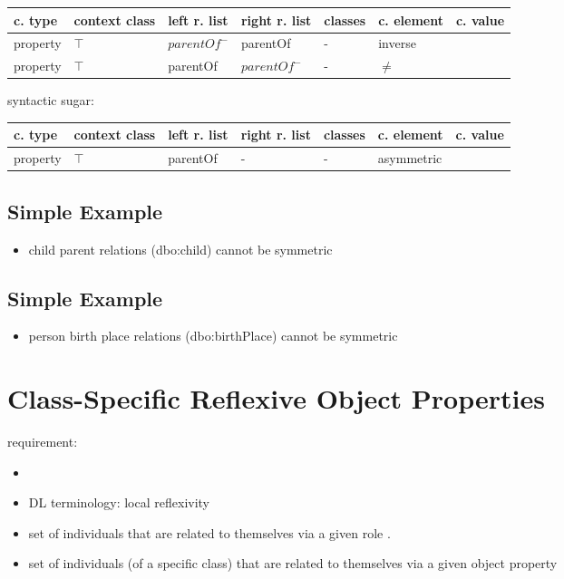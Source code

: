 \documentclass{llncs}
\newenvironment{gcotable}{
  \scriptsize
  \sffamily
  \vspace{0.3cm}
	\begin{center}
  \begin{tabular}{l|l|l|l|l|l|l}
  \hline
  \textbf{c. type} & \textbf{context class} & \textbf{left r. list} & \textbf{right r. list} & \textbf{classes} & \textbf{c. element} & \textbf{c. value} \\
  \hline

}{
  \hline
  \end{tabular}
	\end{center}
}
\begin{document}
\begin{gcotable}
property & $\top$ & $parentOf^{-}$ & parentOf & - & inverse \\
property & $\top$ & parentOf & $parentOf^{-}$ & - & $\ne$ \\
\end{gcotable}

syntactic sugar:

\begin{gcotable}
property & $\top$ & parentOf & - & - & asymmetric \\
\end{gcotable}

\subsection{Simple Example}

\begin{itemize}
	\item child parent relations (dbo:child) cannot be symmetric
\end{itemize}

\subsection{Simple Example}

\begin{itemize}
	\item person birth place relations (dbo:birthPlace) cannot be symmetric
\end{itemize}

\section{Class-Specific Reflexive Object Properties}

requirement:

\begin{itemize}
	\item 
\end{itemize}



\begin{itemize}
  \item DL terminology: local reflexivity
	\item set of individuals that are related to themselves via a given role \cite{Kroetzsch2012}.
	\item set of individuals (of a specific class) that are related to themselves via a given object property
\end{itemize}
\end{document}

